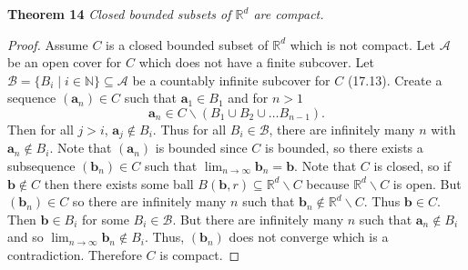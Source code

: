 \documentclass{article}
\begin{document}
\begin{flushleft}
\textbf{Theorem 14}
\textsl{Closed bounded subsets of $\mathbb{R}^d$ are compact.}
\begin{proof}
Assume $C$ is a closed bounded subset of $\mathbb{R}^d$ which is not compact. Let $\mathcal{A}$ be an open cover for $C$ which does not have a finite subcover. Let $\mathcal{B} = \{B_i \mid i \in \mathbb{N}\} \subseteq \mathcal{A}$ be a countably infinite subcover for $C$ (17.13). Create a sequence $(\mathbf{a}_n) \in C$ such that $\mathbf{a}_1 \in B_1$ and for $n>1$
\[
\mathbf{a}_n \in C \backslash (B_1 \cup B_2 \cup \dots B_{n-1}).
\]
Then for all $j > i$, $\mathbf{a}_j \notin B_i$. Thus for all $B_i \in \mathcal{B}$, there are infinitely many $n$ with $\mathbf{a}_n \notin B_i$. Note that $(\mathbf{a}_n)$ is bounded since $C$ is bounded, so there exists a subsequence $(\mathbf{b}_n) \in C$ such that $\lim_{n \rightarrow \infty} \mathbf{b}_n = \mathbf{b}$. Note that $C$ is closed, so if $\mathbf{b} \notin C$ then there exists some ball $B(\mathbf{b}, r) \subseteq \mathbb{R}^d \backslash C$ because $\mathbb{R}^d \backslash C$ is open. But $(\mathbf{b}_n) \in C$ so there are infinitely many $n$ such that $\mathbf{b}_n \notin \mathbb{R}^d \backslash C$. Thus $\mathbf{b} \in C$. Then $\mathbf{b} \in B_i$ for some $B_i \in \mathcal{B}$. But there are infinitely many $n$ such that $\mathbf{a}_n \notin B_i$ and so $\lim_{n \rightarrow \infty} \mathbf{b}_n \notin B_i$. Thus, $(\mathbf{b}_n)$ does not converge which is a contradiction. Therefore $C$ is compact.
\end{proof}

\end{flushleft}
\end{document}
